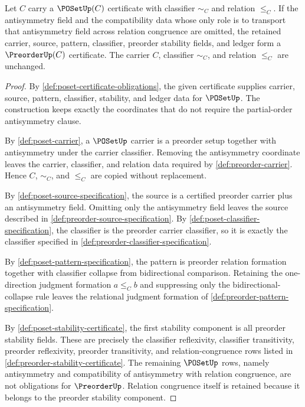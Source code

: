 \begin{proposition}
\label{prop:poset-forgets-preorder-certificate}
Let $C$ carry a $\POSetUp(C)$ certificate with classifier $\sim_C$ and relation $\le_C$. If the antisymmetry field and the compatibility data whose only role is to transport that antisymmetry field across relation congruence are omitted, the retained carrier, source, pattern, classifier, preorder stability fields, and ledger form a $\PreorderUp(C)$ certificate. The carrier $C$, classifier $\sim_C$, and relation $\le_C$ are unchanged.
\end{proposition}
\begin{proof}
By \autoref{def:poset-certificate-obligations}, the given certificate supplies carrier, source, pattern, classifier, stability, and ledger data for $\POSetUp$. The construction keeps exactly the coordinates that do not require the partial-order antisymmetry clause.

By \autoref{def:poset-carrier}, a $\POSetUp$ carrier is a preorder setup together with antisymmetry under the carrier classifier. Removing the antisymmetry coordinate leaves the carrier, classifier, and relation data required by \autoref{def:preorder-carrier}. Hence $C$, $\sim_C$, and $\le_C$ are copied without replacement.

By \autoref{def:poset-source-specification}, the source is a certified preorder carrier plus an antisymmetry field. Omitting only the antisymmetry field leaves the source described in \autoref{def:preorder-source-specification}. By \autoref{def:poset-classifier-specification}, the classifier is the preorder carrier classifier, so it is exactly the classifier specified in \autoref{def:preorder-classifier-specification}.

By \autoref{def:poset-pattern-specification}, the pattern is preorder relation formation together with classifier collapse from bidirectional comparison. Retaining the one-direction judgment formation $a\le_C b$ and suppressing only the bidirectional-collapse rule leaves the relational judgment formation of \autoref{def:preorder-pattern-specification}.

By \autoref{def:poset-stability-certificate}, the first stability component is all preorder stability fields. These are precisely the classifier reflexivity, classifier transitivity, preorder reflexivity, preorder transitivity, and relation-congruence rows listed in \autoref{def:preorder-stability-certificate}. The remaining $\POSetUp$ rows, namely antisymmetry and compatibility of antisymmetry with relation congruence, are not obligations for $\PreorderUp$. Relation congruence itself is retained because it belongs to the preorder stability component.


\end{proof}
